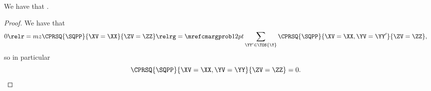 \begin{proposition}
  We have that \sqcpmargzimplprop.%
\end{proposition}

\begin{proof}
  We have that
  $$0 \relr = mz \CPRSQ{\SQPP}{\XV = \XX}{\ZV = \ZZ} \relrg = {\mrefcmargprob} 12pt \sum_{\YY' \in \TOS{\Y}} \CPRSQ{\SQPP}{\XV = \XX, \YV = \YY'}{\ZV = \ZZ},$$%
  so in particular 
  $$\CPRSQ{\SQPP}{\XV = \XX, \YV = \YY}{\ZV = \ZZ} = 0.$$%
\end{proof}
